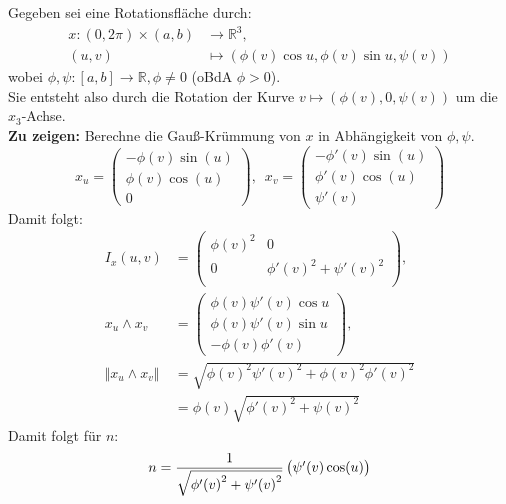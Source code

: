 \begin{problem*}[2a]
  Gegeben sei eine Rotationsfläche durch:
  \begin{align*}
    x:(0,2\pi) \times (a,b) &\to \mathbb{R}^3, \\
    (u,v) &\mapsto (\phi(v)\cos u, \phi(v)\sin u, \psi(v))
  \end{align*}
  wobei \( \phi, \psi: [a,b] \to \mathbb{R}, \phi \neq 0 \) (oBdA \( \phi > 0 \)). \\ 
  Sie entsteht also durch die Rotation der Kurve \( v \mapsto (\phi(v), 0, \psi(v)) \) um die \( x_3 \)-Achse. \\
  \textbf{Zu zeigen:} Berechne die Gauß-Krümmung von \( x \) in Abhängigkeit von \( \phi, \psi \).
  \begin{equation*}
    x_u = \begin{pmatrix}
      -\phi(v)\sin(u) \\ \phi(v)\cos(u) \\ 0	
    \end{pmatrix}, \enspace
    x_v = \begin{pmatrix}
      -\phi'(v)\sin(u) \\ \phi'(v)\cos(u) \\ \psi'(v)	
    \end{pmatrix} 
  \end{equation*}
  Damit folgt: 
  \begin{align*}
    I_x(u,v) &= 
    \begin{pmatrix}
      {\phi(v)}^2 & 0 \\
      0 & {\phi'(v)}^2 + {\psi'(v)}^2 \\
    \end{pmatrix}, \\
    x_u \land x_v &= 
    \begin{pmatrix}
      \phi(v) \psi'(v) \cos u \\
      \phi(v) \psi'(v) \sin u \\
      -\phi(v) \phi'(v)
    \end{pmatrix}, \\
    \Vert x_u \land x_v \Vert &= \sqrt{ {\phi(v)}^2 {\psi'(v)}^2 + {\phi(v)}^2 {\phi'(v)}^2} \\
    &= \phi(v) \sqrt{ {\phi'(v)}^2 + {\psi(v)}^2}
  \end{align*}
  Damit folgt für \( n \):
  \begin{equation*}
    \centering
    n = \frac{1}{\sqrt{ {\phi'(v)}^2 + {\psi'(v)}^2}} \begin{pmatrix}
      \psi'(v) \cos(u) \\

\end{pmatrix}
\end{equation*}
\end{problem*}
